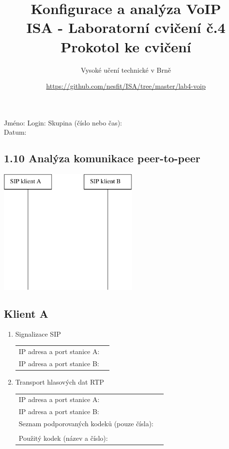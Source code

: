 \documentclass[a4paper,11pt]{article}
\title{Konfigurace a analýza VoIP\\
{\bf\large ISA - Laboratorní cvičení č.4}\\
{\bf\large Prokotol ke cvičení}}
\author{Vysoké učení technické v Brně}
\date{\url{https://github.com/nesfit/ISA/tree/master/lab4-voip}}
\begin{document}
{\let\newpage\relax\maketitle}
\vspace{-3mm}
Jméno: \hspace{4cm} Login: \hspace{4cm} Skupina (číslo nebo čas):\\
Datum:

\vspace{-2mm}
\subsection*{1.10 Analýza komunikace peer-to-peer}
\begin{multicols}{2}
  \begin{center}
    \includegraphics[width=70mm]{img/peer-to-peer.eps}
  \end{center}
  \columnbreak
  \subsection*{Klient A}      
  \begin{enumerate}
    \item Signalizace SIP
    
    \begin{tabular}{lp{2cm}}
      IP adresa a port stanice A: &\\
      IP adresa a port stanice B: &\\
    \end{tabular}               
   
    \item Transport hlasových dat RTP
    
    \begin{tabular}{lp{2cm}}
      IP adresa a port stanice A: &\\
      IP adresa a port stanice B: &\\
      Seznam podporovaných kodeků (pouze čísla):&\\
      &\\
      Použitý kodek (název a číslo): &\\
    \end{tabular}               
  \end{enumerate}      
\end{multicols}
\end{document}
